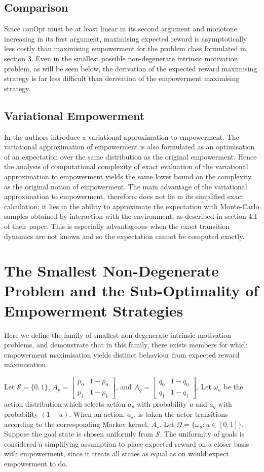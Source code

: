 \documentclass{article}
\newcommand{\Ss}{\mathcal{S}}
\begin{document}
\subsection{Comparison}
Since $\text{conOpt}$ must be at least linear in its second argument and monotone increasing in its first argument, maximising expected reward is asymptotically less costly than maximising empowerment for the problem class formulated in section 3.
Even in the smallest possible non-degenerate intrinsic motivation problem, as will be seen below, the derivation of the expected reward maximising strategy is far less difficult than derivation of the empowerment maximising strategy. 

\subsection{Variational Empowerment}
In \cite{mohamed2015variational} the authors introduce a variational approximation to empowerment. The variational approximation of empowerment is also formulated as an optimisation of an expectation over the same distribution as the original empowerment. Hence the analysis of computational complexity of exact evaluation of the variational approximation to empowerment yields the same lower bound on the complexity as the original notion of empowerment. The main advantage of the variational approximation to empowerment, therefore, does not lie in its simplified exact calculation; it lies in the ability to approximate the expectation with Monte-Carlo samples obtained by interaction with the environment, as described in section 4.1 of their paper. This is especially advantageous when the exact transition dynamics are not known and so the expectation cannot be computed exactly. 

\section{The Smallest Non-Degenerate Problem and the Sub-Optimality of Empowerment Strategies}
Here we define the family of smallest non-degenerate intrinsic motivation problems, and demonstrate that in this family, there exists members for which empowerment maximisation yields distinct behaviour from expected reward maximisation.

Let $\Ss=\{0,1\}$, $A_p=\left[\begin{matrix} p_0 & 1-p_0 \\ p_1 & 1-p_1\end{matrix}\right]$, and $A_q=\left[\begin{matrix} q_0 & 1-q_0 \\ q_1 & 1-q_1\end{matrix}\right]$. Let $\omega_u$ be the action distribution which selects action $a_p$ with probability $u$ and $a_q$ with probability $(1-u)$. When an action, $a_\star$, is taken the actor transitions according to the corresponding Markov kernel, $A_\star$. Let $\Omega=\{\omega_u:u\in[0,1]\}$. Suppose the goal state is chosen uniformly from $\Ss$. The uniformity of goals is considered a simplifying assumption to place expected reward on a closer basis with empowerment, since it treats all states as equal as on would expect empowerment to do.
\end{document}
